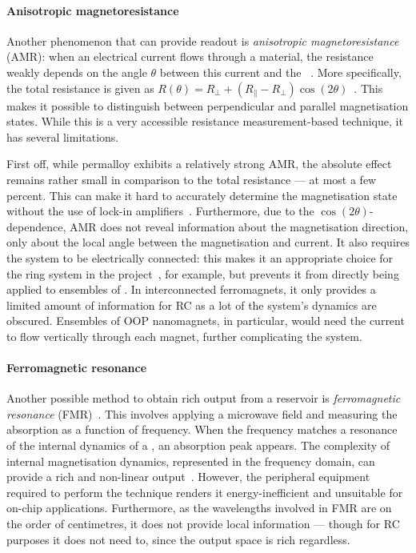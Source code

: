 \paragraph{Anisotropic magnetoresistance}
Another phenomenon that can provide readout is \emph{anisotropic magnetoresistance} (AMR): when an electrical current flows through a  material, the resistance weakly depends on the angle $\theta$ between this current and the ~\cite{AMR}.
More specifically, the total resistance is given as $R(\theta) = R_\perp + (R_\parallel - R_\perp) \cos(2\theta)$~\cite{Hu2023}.
This makes it possible to distinguish between perpendicular and parallel magnetisation states.
While this is a very accessible resistance measurement-based technique, it has several limitations. \par
First off, while permalloy exhibits a relatively strong AMR, the absolute effect remains rather small in comparison to the total resistance --- at most a few percent.
This can make it hard to accurately determine the magnetisation state without the use of lock-in amplifiers~\cite{ArchitecturesNanoringRC,Vidamour2023}.
Furthermore, due to the $\cos(2 \theta)$-dependence, AMR does not reveal information about the magnetisation direction, only about the local angle between the magnetisation and current.
It also requires the system to be electrically connected: this makes it an appropriate choice for the ring system in the \spinengine project~\cite{Vidamour2023,ArchitecturesNanoringRC,DynamicEmergence_NanomagneticSystem}, for example, but prevents it from directly being applied to ensembles of .
In interconnected ferromagnets, it only provides a limited amount of information for RC as a lot of the system's dynamics are obscured.
Ensembles of OOP nanomagnets, in particular, would need the current to flow vertically through each magnet, further complicating the system.

\paragraph{Ferromagnetic resonance}
Another possible method to obtain rich output from a reservoir is \emph{ferromagnetic resonance} (FMR)~\cite{NeuromorphicFewShot,gartside2022reconfigurable}.
This involves applying a microwave field and measuring the absorption as a function of frequency.
When the frequency matches a resonance of the internal  dynamics of a , an absorption peak appears.
The complexity of internal magnetisation dynamics, represented in the frequency domain, can provide a rich and non-linear  output~\cite{NeuromorphicFewShot,Gomez-Iriarte_FMR}.
However, the peripheral equipment required to perform the technique renders it energy-inefficient and unsuitable for on-chip applications.
Furthermore, as the wavelengths involved in FMR are on the order of centimetres, it does not provide local information --- though for RC purposes it does not need to, since the output space is rich regardless.

